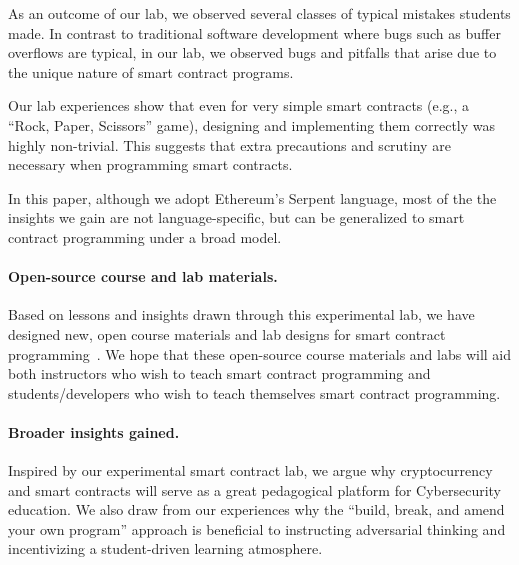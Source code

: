 \documentclass{llncs}
\newcommand{\elaine}[1]{}
\begin{document}



As an outcome of our lab, we observed several classes
of typical mistakes students made. 
In contrast to  
traditional software development where 
bugs such as buffer overflows are typical, 
in our lab, we observed 
bugs and pitfalls that arise due to 
the unique nature of smart contract programs.

Our lab experiences show that even for 
very simple smart contracts (e.g., a 
``Rock, Paper, Scissors'' game), 
designing and implementing them correctly
was highly non-trivial.
This suggests that extra precautions 
and scrutiny 
are necessary when programming smart contracts.

In this paper, although we adopt Ethereum's Serpent language,
most of the the insights we gain 
are not language-specific, but can be generalized to 
smart contract programming
under a broad model.


\paragraph{Open-source course and lab materials.}
Based on lessons and insights 
drawn through this experimental lab, we have designed
new, open course materials and lab designs 
for smart contract programming~\cite{anonymousethlab}.
We hope that these open-source course materials and labs
will aid both instructors who 
wish to teach smart contract programming and students/developers who 
wish to teach themselves smart contract programming.
\elaine{probably the langugage can be better.}

\paragraph{Broader insights gained.}
Inspired by our experimental 
smart contract lab, 
we argue why cryptocurrency and smart contracts 
will serve as a great pedagogical platform 
for Cybersecurity education.
We also draw from our experiences
why the ``build, break, and amend your own program'' 
approach is beneficial to instructing adversarial thinking
and incentivizing a student-driven learning 
atmosphere.
\end{document}
